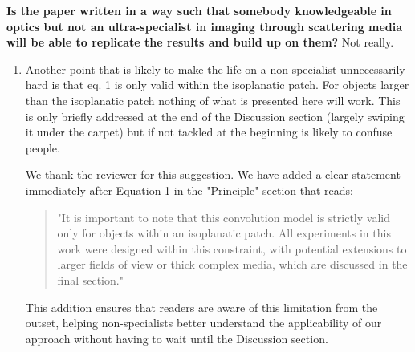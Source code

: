 \documentclass[12pt]{article}
\newenvironment{solved_reviewercomment}
    {\begin{tcolorbox}[width=\linewidth,colback=gray!5,colframe=solved_commentcolor!50,title=Reviewer Comment,left=5pt,right=5pt]}
    {\end{tcolorbox}}
\newenvironment{ourresponse}
    {\begin{tcolorbox}[width=\linewidth,breakable,enhanced,colback=gray!5,colframe=responsecolor!50,title=Response,left=5pt,right=5pt]}
    {\end{tcolorbox}}
\begin{document}
\textbf{Is the paper written in a way such that somebody knowledgeable in optics but not an ultra-specialist in imaging through scattering media will be able to replicate the results and build up on them?} Not really. 
\begin{enumerate}[label=\arabic*.]

    \begin{solved_reviewercomment}
        The main culprit is that the whole CRT-CLASS/I-CLASS are not well-known algorithms, and the only reference given to readers to make themselves familiar with them is not self-contained. \textbf{This has a very easy fix:} add a section in the supplementary information with an explanation of how and why the algorithm works (there is no space restriction there, so there is also no excuse to provide the necessary information).
    \end{solved_reviewercomment}
    \begin{ourresponse}
        It is the same comment as the first referee.
    \end{ourresponse}

    \item \leavevmode\vspace{-\baselineskip}
    \begin{solved_reviewercomment}
        Another point that is likely to make the life on a non-specialist unnecessarily hard is that eq. 1 is only valid within the isoplanatic patch. For objects larger than the isoplanatic patch nothing of what is presented here will work. This is only briefly addressed at the end of the Discussion section (largely swiping it under the carpet) but if not tackled at the beginning is likely to confuse people.
        
    \end{solved_reviewercomment}
    \begin{ourresponse}
        We thank the reviewer for this suggestion. 
        We have added a clear statement immediately after Equation 1 in the "Principle" section that reads:
        \begin{quote}
            "It is important to note that this convolution model is strictly valid only for objects within an isoplanatic patch. All experiments in this work were designed within this constraint, with potential extensions to larger fields of view or thick complex media, which are discussed in the final section."
        \end{quote}
        
        This addition ensures that readers are aware of this limitation from the outset, helping non-specialists better understand the applicability of our approach without having to wait until the Discussion section.
    \end{ourresponse}
    

\end{enumerate}
\end{document}
